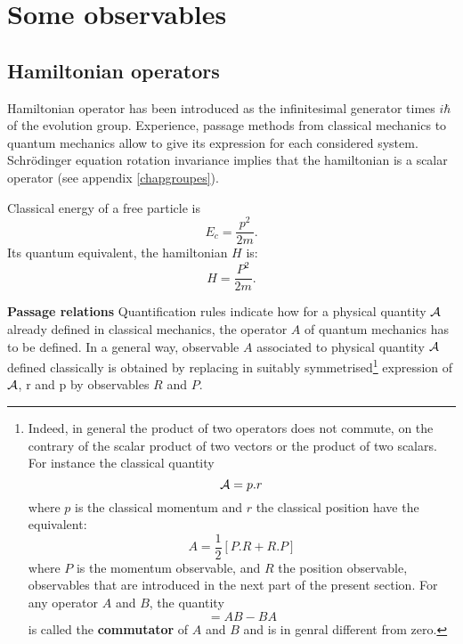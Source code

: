 \documentclass[12pt]{book}
\begin{document}
\section{Some  observables}
\subsection{Hamiltonian operators}
Hamiltonian operator  has been introduced as
the infinitesimal generator times  $i\hbar$ of the evolution
group. Experience, passage methods from classical mechanics to quantum mechanics
allow to give its expression for each considered system.
Schr\"odinger equation rotation invariance implies that the hamiltonian is a
scalar operator
(see appendix \ref{chapgroupes}).
\begin{exmp}
Classical energy of a free particle is
\begin{equation}
E_c=\frac{p^2}{2m}.
\end{equation}
Its quantum equivalent, the hamiltonian $H$ is:
\begin{equation}
H=\frac{P^2}{2m}.
\end{equation}
\end{exmp}
\begin{rem}{\bf Passage relations}
Quantification rules \cite{ph:mecaq:Cohen73} indicate how for a physical
quantity ${\cal A}$ already defined in classical mechanics, the operator $A$
of quantum mechanics has to be defined. In a general way, observable
$A$ associated to physical quantity $\cal A$ 
defined classically is obtained by replacing in suitably
symmetrised\footnote{Indeed, in general the product of two operators
does not commute, on the contrary of the scalar product of two vectors
or the product of two scalars. For instance the classical quantity 
\begin{equation}
{\cal A}=p.r
\end{equation}
where $p$ is the classical momentum and $r$ the classical position
have the equivalent:
\begin{equation}
A=\frac{1}{2}[P.R+R.P]
\end{equation}
where $P$ is the momentum observable, and $R$ the position observable,
observables that are introduced in the next part of the present section.
For any operator $A$ and $B$, the quantity
\begin{equation}
[A,B]=AB-BA
\end{equation}
is called the {\bf commutator} of $A$ and $B$ and is
in genral 
different from zero.
}
 expression
of $\cal A$, r and p by observables $R$ and $P$. 
\end{rem}
\end{document}
